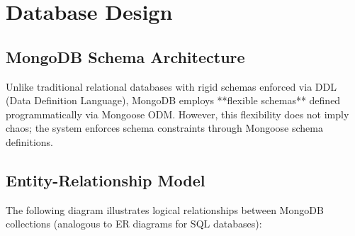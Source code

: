 \section{Database Design}

\subsection{MongoDB Schema Architecture}

Unlike traditional relational databases with rigid schemas enforced via DDL (Data Definition Language), MongoDB employs **flexible schemas** defined programmatically via Mongoose ODM. However, this flexibility does not imply chaos; the system enforces schema constraints through Mongoose schema definitions.

\subsection{Entity-Relationship Model}

The following diagram illustrates logical relationships between MongoDB collections (analogous to ER diagrams for SQL databases):

